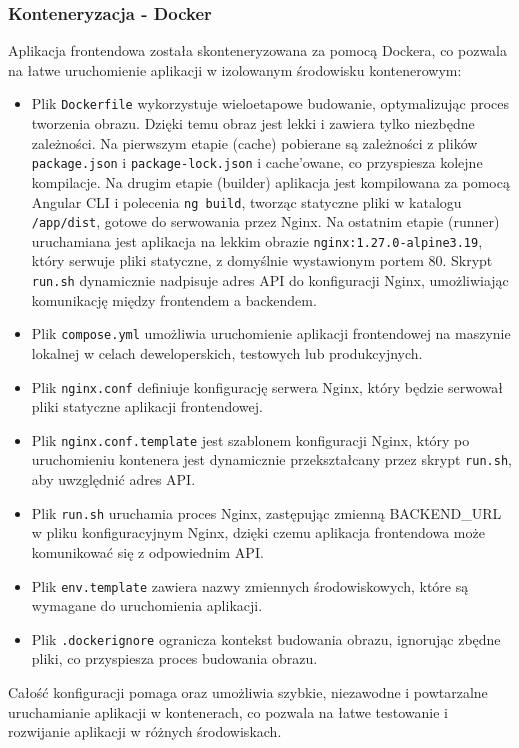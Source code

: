 \documentclass[../../main.tex]{subfiles}
\begin{document}
    \subsubsection{Konteneryzacja - Docker}
    Aplikacja frontendowa została skonteneryzowana za pomocą Dockera, co pozwala na łatwe uruchomienie aplikacji w izolowanym środowisku kontenerowym:

    \begin{itemize}
        \item Plik \texttt{Dockerfile} wykorzystuje wieloetapowe budowanie, optymalizując proces tworzenia obrazu. Dzięki temu obraz jest lekki i zawiera tylko niezbędne zależności.
        Na pierwszym etapie (cache) pobierane są zależności z plików \texttt{package.json} i \texttt{package-lock.json} i cache’owane, co przyspiesza kolejne kompilacje.
        Na drugim etapie (builder) aplikacja jest kompilowana za pomocą Angular CLI i polecenia \texttt{ng build}, tworząc statyczne pliki w katalogu \texttt{/app/dist}, gotowe do serwowania przez Nginx.
        Na ostatnim etapie (runner) uruchamiana jest aplikacja na lekkim obrazie \texttt{nginx:1.27.0-alpine3.19}, który serwuje pliki statyczne, z domyślnie wystawionym portem 80. Skrypt \texttt{run.sh} dynamicznie nadpisuje adres API do konfiguracji Nginx, umożliwiając komunikację między frontendem a backendem.
        \item Plik \texttt{compose.yml} umożliwia uruchomienie aplikacji frontendowej na maszynie lokalnej w celach deweloperskich, testowych lub produkcyjnych.
        \item Plik \texttt{nginx.conf} definiuje konfigurację serwera Nginx, który będzie serwował pliki statyczne aplikacji frontendowej.
        \item Plik \texttt{nginx.conf.template} jest szablonem konfiguracji Nginx, który po uruchomieniu kontenera jest dynamicznie przekształcany przez skrypt \texttt{run.sh}, aby uwzględnić adres API.
        \item Plik \texttt{run.sh} uruchamia proces Nginx, zastępując zmienną BACKEND\_URL w pliku konfiguracyjnym Nginx, dzięki czemu aplikacja frontendowa może komunikować się z odpowiednim API.
        \item Plik \texttt{env.template} zawiera nazwy zmiennych środowiskowych, które są wymagane do uruchomienia aplikacji.
        \item Plik \texttt{.dockerignore} ogranicza kontekst budowania obrazu, ignorując zbędne pliki, co przyspiesza proces budowania obrazu.
    \end{itemize}
    Całość konfiguracji pomaga oraz umożliwia szybkie, niezawodne i powtarzalne uruchamianie aplikacji w kontenerach, co pozwala na łatwe testowanie i rozwijanie aplikacji w różnych środowiskach.
\end{document}
